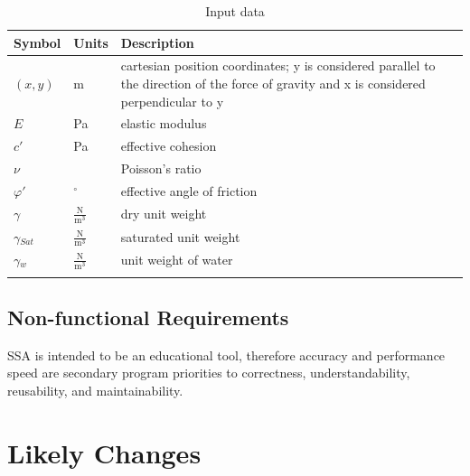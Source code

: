 \documentclass[12pt]{article}
\begin{document}
\begin{longtable}{l l l}
\toprule
Symbol & Units & Description
\\
\midrule
$(x,y)$ & m & cartesian position coordinates; y is considered parallel to the direction of the force of gravity and x is considered perpendicular to y
\\
$E$ & Pa & elastic modulus
\\
$c'$ & Pa & effective cohesion
\\
$\nu{}$ &  & Poisson's ratio
\\
$\varphi{}'$ & ${}^{\circ}$ & effective angle of friction
\\
$\gamma{}$ & $\frac{\text{N}}{\text{m}^{3}}$ & dry unit weight
\\
$\gamma{}_{Sat}$ & $\frac{\text{N}}{\text{m}^{3}}$ & saturated unit weight
\\
$\gamma{}_{w}$ & $\frac{\text{N}}{\text{m}^{3}}$ & unit weight of water
\\
\bottomrule
\caption{Input data}
\label{Table:Inpudata}
\end{longtable}
\subsection{Non-functional Requirements}
\label{Sec:Non-Requ}
SSA is intended to be an educational tool, therefore accuracy and performance speed are secondary program priorities to correctness, understandability, reusability, and maintainability.
\section{Likely Changes}
\label{Sec:LikeChan}
\end{document}
